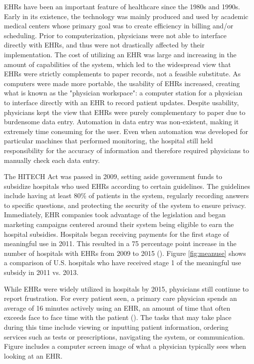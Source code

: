 \documentclass[11pt]{article}
\begin{document}
EHRs have been an important feature of healthcare since the 1980s and 1990s. Early in its existence, the technology was mainly produced and used by academic medical centers whose primary goal was to create efficiency in billing and/or scheduling. Prior to computerization, physicians were not able to interface directly with EHRs, and thus were not drastically affected by their implementation. The cost of utilizing an EHR was large and increasing in the amount of capabilities of the system, which led to the widespread view that EHRs were strictly complements to paper records, not a feasible substitute. As computers were made more portable, the usability of EHRs increased, creating what is known as the "physician workspace": a computer station for a physician to interface directly with an EHR to record patient updates. Despite usability, physicians kept the view that EHRs were purely complementary to paper due to burdensome data entry. Automation in data entry was non-existent, making it extremely time consuming for the user. Even when automation was developed for particular machines that performed monitoring, the hospital still held responsibility for the accuracy of information and therefore required physicians to manually check each data entry. 

The HITECH Act was passed in 2009, setting aside government funds to subsidize hospitals who used EHRs according to certain guidelines. The guidelines include having at least 80\% of patients in the system, regularly recording answers to specific questions, and protecting the security of the system to ensure privacy. Immediately, EHR companies took advantage of the legislation and began marketing campaigns centered around their system being eligible to earn the hospital subsidies. Hospitals began receiving payments for the first stage of meaningful use in 2011. This resulted in a 75 percentage point increase in the number of hospitals with EHRs from 2009 to 2015 (\cite{stats}). Figure \ref{fig:meanuse} shows a comparison of U.S. hospitals who have received stage 1 of the meaningful use subsidy in 2011 vs. 2013. 


While EHRs were widely utilized in hospitals by 2015, physicians still continue to report frustration. For every patient seen, a primary care physician spends an average of 16 minutes actively using an EHR, an amount of time that often exceeds face to face time with the patient (\cite{overhage2020physician}). The tasks that may take place during this time include viewing or inputting patient information, ordering services such as tests or prescriptions, navigating the system, or communication. Figure includes a computer screen image of what a physician typically sees when looking at an EHR. 
\end{document}

